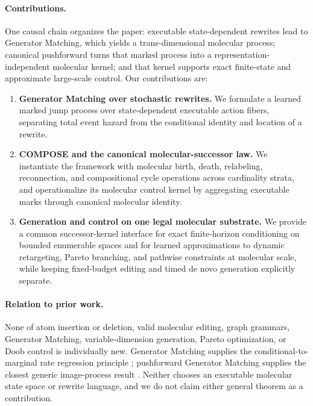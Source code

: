 \documentclass[10pt,letterpaper]{article}
\begin{document}
\paragraph{Contributions.}
One causal chain organizes the paper: executable state-dependent rewrites lead
to Generator Matching, which yields a trans-dimensional molecular process;
canonical pushforward turns that marked process into a representation-independent
molecular kernel; and that kernel supports exact finite-state and approximate
large-scale control. Our contributions are:

\begin{enumerate}
  \item \textbf{Generator Matching over stochastic rewrites.} We formulate a
  learned marked jump process over state-dependent executable action fibers,
  separating total event hazard from the conditional identity and location of
  a rewrite.

  \item \textbf{COMPOSE and the canonical molecular-successor law.} We
  instantiate the framework with molecular birth, death, relabeling,
  reconnection, and compositional cycle operations across cardinality strata,
  and operationalize its molecular control kernel by aggregating executable
  marks through canonical molecular identity.

  \item \textbf{Generation and control on one legal molecular substrate.} We
  provide a common successor-kernel interface for exact finite-horizon
  conditioning on bounded enumerable spaces and for learned approximations to
  dynamic retargeting, Pareto branching, and pathwise constraints at molecular
  scale, while keeping fixed-budget editing and timed de novo generation
  explicitly separate.
\end{enumerate}

\paragraph{Relation to prior work.}
None of atom insertion or deletion, valid molecular editing, graph grammars,
Generator Matching, variable-dimension generation, Pareto optimization, or
Doob control is individually new. Generator Matching supplies the
conditional-to-marginal rate regression principle
\citep{holderrieth2025generator}; pushforward Generator Matching supplies the
closest generic image-process result \citep{billera2026latent}. Neither chooses
an executable molecular state space or rewrite language, and we do not claim
either general theorem as a contribution.
\end{document}
